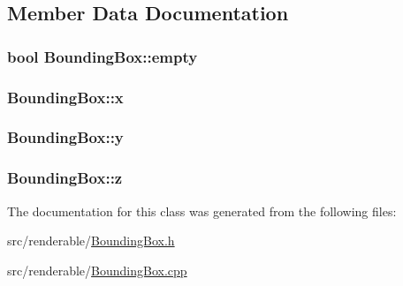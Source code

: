 \subsection{Member Data Documentation}
\subsubsection[{\texorpdfstring{empty}{empty}}]{\setlength{\rightskip}{0pt plus 5cm}bool Bounding\+Box\+::empty\hspace{0.3cm}{\ttfamily [private]}}\hypertarget{classBoundingBox_a498e443b213cc08f7c0235688dd2ecf8}{}\label{classBoundingBox_a498e443b213cc08f7c0235688dd2ecf8}
\subsubsection[{\texorpdfstring{x}{x}}]{ Bounding\+Box\+::x\hspace{0.3cm}{\ttfamily [private]}}\hypertarget{classBoundingBox_a93ea5f12ef2300fe61925f6b44faaebe}{}\label{classBoundingBox_a93ea5f12ef2300fe61925f6b44faaebe}
\subsubsection[{\texorpdfstring{y}{y}}]{ Bounding\+Box\+::y\hspace{0.3cm}{\ttfamily [private]}}\hypertarget{classBoundingBox_a593fd6b66d3ed0352d92024685863090}{}\label{classBoundingBox_a593fd6b66d3ed0352d92024685863090}
\subsubsection[{\texorpdfstring{z}{z}}]{ Bounding\+Box\+::z\hspace{0.3cm}{\ttfamily [private]}}\hypertarget{classBoundingBox_a9a6005ebe3550447aad804123fa68fea}{}\label{classBoundingBox_a9a6005ebe3550447aad804123fa68fea}


The documentation for this class was generated from the following files\+:\begin{DoxyCompactItemize}
\item 
src/renderable/\hyperlink{BoundingBox_8h}{Bounding\+Box.\+h}\item 
src/renderable/\hyperlink{BoundingBox_8cpp}{Bounding\+Box.\+cpp}\end{DoxyCompactItemize}
